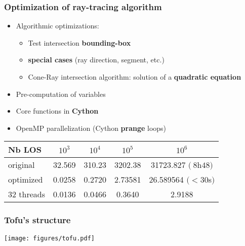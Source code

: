 \documentclass[10pt]{beamer}
\begin{document}
\begin{frame}
\frametitle{Optimization of ray-tracing algorithm}


	\begin{itemize}
	\item Algorithmic optimizations:
	\begin{itemize}
		\item Test intersection \textbf{bounding-box}
		\item \textbf{special cases} (ray direction, segment, etc.)
		\item Cone-Ray intersection algorithm: solution of a\textbf{ quadratic equation}
	\end{itemize}
	\item Pre-computation of variables
	\item Core functions in \textbf{Cython}
	\item OpenMP parallelization (Cython \textbf{prange} loops)
	\end{itemize}
\pause
\begin{table}[h] %
    \centering
    \label{tab:LOS_init_sirrah}
     \begin{tabular}{@{}l*{4}{S[table-format=1.2e-1,scientific-notation=true]}@{}}
       \toprule
       \textbf{Nb LOS} &  {$10^3$} & {$10^4$} & {$10^5$} & {$10^6$}\\
       \midrule
       original       & 32.569 & 310.23 & 3202.38 & 31723.827 $(~8$h$48)$\\
       optimized   & 0.0258 & 0.2720 & 2.73581 & 26.589564 $(<30$s$)$\\
       32 threads & 0.0136 & 0.0466 & 0.3640 & 2.9188 \\
       \bottomrule
     \end{tabular}
\end{table}
\end{frame}


\begin{frame}
\frametitle{Tofu's structure}

\begin{center}
    	\texttt{[image: figures/tofu.pdf]}
\end{center}
	
\end{frame}
\end{document}
